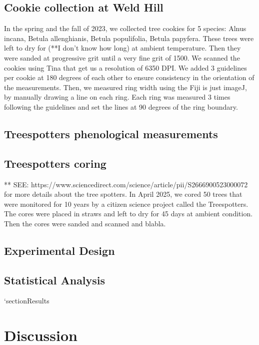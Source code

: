 \documentclass{article}
\begin{document}
\subsection{Cookie collection at Weld Hill}
In the spring and the fall of 2023, we collected tree cookies for 5 species: Alnus incana, Betula allenghianis, Betula populifolia, Betula papyfera. These trees were left to dry for (**I don't know how long) at ambient temperature. Then they were sanded at progressive grit until a very fine grit of 1500. We scanned the cookies using Tina that get us a resolution of 6350 DPI. We added 3 guidelines per cookie at 180 degrees of each other to ensure consistency in the orientation of the measurements. Then, we measured ring width using the Fiji is just imageJ, by manually drawing a line on each ring. Each ring was measured 3 times following the guidelines and set the lines at 90 degrees of the ring boundary. 

\subsection {Treespotters phenological measurements}

\subsection {Treespotters coring}

** SEE: https://www.sciencedirect.com/science/article/pii/S2666900523000072 for more details about the tree spotters.
In April 2025, we cored 50 trees that were monitored for 10 years by a citizen science project called the Treespotters. The cores were placed in straws and left to dry for 45 days at ambient condition. Then the cores were sanded and scanned and blabla. 

\subsection{Experimental Design}

\subsection{Statistical Analysis}
`section{Results}
\section{Discussion}

\printbibliography
\end{document}

